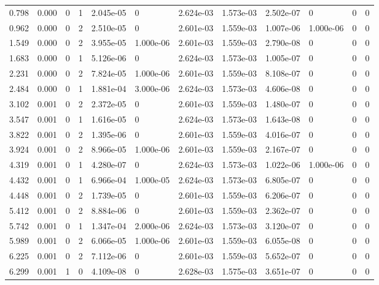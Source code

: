 \documentclass[preview]{standalone}
\begin{document}
{{\begin{tabular}{L{1.2cm}C{1.2cm} C{0.3cm}C{0.5cm} C{1.4cm}C{1.4cm} C{1.4cm}C{1.4cm} C{1.6cm}C{1.6cm} C{1.6cm}C{1.6cm}}
  0.798  &  0.000  & 0     &  1 &  2.045e-05  & 0  &  2.624e-03&   1.573e-03& 2.502e-07 & 0   &  0 & 0  \\ 
  0.962  &  0.000  & 0     &  2 &  2.510e-05  & 0  &  2.601e-03&   1.559e-03& 1.007e-06 & 1.000e-06   &  0 & 0  \\ 
  1.549  &  0.000  & 0     &  2 &  3.955e-05  & 1.000e-06  &  2.601e-03&   1.559e-03& 2.790e-08 & 0   &  0 & 0  \\ 
  1.683  &  0.000  & 0     &  1 &  5.126e-06  & 0  &  2.624e-03&   1.573e-03& 1.005e-07 & 0   &  0 & 0  \\ 
  2.231  &  0.000  & 0     &  2 &  7.824e-05  & 1.000e-06  &  2.601e-03&   1.559e-03& 8.108e-07 & 0   &  0 & 0  \\ 
  2.484  &  0.000  & 0     &  1 &  1.881e-04  & 3.000e-06  &  2.624e-03&   1.573e-03& 4.606e-08 & 0   &  0 & 0  \\ 
  3.102  &  0.001  & 0     &  2 &  2.372e-05  & 0  &  2.601e-03&   1.559e-03& 1.480e-07 & 0   &  0 & 0  \\ 
  3.547  &  0.001  & 0     &  1 &  1.616e-05  & 0  &  2.624e-03&   1.573e-03& 1.643e-08 & 0   &  0 & 0  \\ 
  3.822  &  0.001  & 0     &  2 &  1.395e-06  & 0  &  2.601e-03&   1.559e-03& 4.016e-07 & 0   &  0 & 0  \\ 
  3.924  &  0.001  & 0     &  2 &  8.966e-05  & 1.000e-06  &  2.601e-03&   1.559e-03& 2.167e-07 & 0   &  0 & 0  \\ 
  4.319  &  0.001  & 0     &  1 &  4.280e-07  & 0  &  2.624e-03&   1.573e-03& 1.022e-06 & 1.000e-06   &  0 & 0  \\ 
  4.432  &  0.001  & 0     &  1 &  6.966e-04  & 1.000e-05  &  2.624e-03&   1.573e-03& 6.805e-07 & 0   &  0 & 0  \\ 
  4.448  &  0.001  & 0     &  2 &  1.739e-05  & 0  &  2.601e-03&   1.559e-03& 6.206e-07 & 0   &  0 & 0  \\ 
  5.412  &  0.001  & 0     &  2 &  8.884e-06  & 0  &  2.601e-03&   1.559e-03& 2.362e-07 & 0   &  0 & 0  \\ 
  5.742  &  0.001  & 0     &  1 &  1.347e-04  & 2.000e-06  &  2.624e-03&   1.573e-03& 3.120e-07 & 0   &  0 & 0  \\ 
  5.989  &  0.001  & 0     &  2 &  6.066e-05  & 1.000e-06  &  2.601e-03&   1.559e-03& 6.055e-08 & 0   &  0 & 0  \\ 
  6.225  &  0.001  & 0     &  2 &  7.112e-06  & 0  &  2.601e-03&   1.559e-03& 5.652e-07 & 0   &  0 & 0  \\ 
  6.299  &  0.001  & 1     &  0 &  4.109e-08  & 0  &  2.628e-03&   1.575e-03& 3.651e-07 & 0   &  0 & 0  \\ 

\end{tabular}}}
\end{document}
